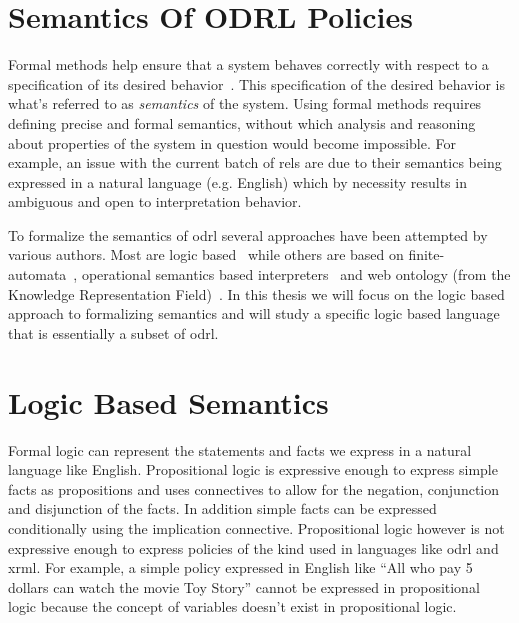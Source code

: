 \section{Semantics Of ODRL Policies}


Formal methods help ensure that a system behaves correctly with respect to a specification of its desired behavior~\cite{TAPL}. This specification of the desired behavior is what's referred to as \emph{semantics} of the system. Using formal methods requires defining precise and formal semantics, without which analysis and reasoning about properties of the system in question would become impossible. For example, an issue with the current batch of \ac{rel}s are due to their semantics being expressed in a natural language (e.g. English) which by necessity results in ambiguous and open to interpretation behavior. 

To formalize the semantics of \ac{odrl} several approaches have been attempted by various authors. Most are logic based~\cite{Halpern2008, pucella2006} while others are based on finite-automata~\cite{Holzer}, operational semantics based interpreters~\cite{Safavi-naini} and web ontology (from the Knowledge Representation Field)~\cite{Kasten2010MTS}. In this thesis we will focus on the logic based approach to formalizing semantics and will study a specific logic based language that is essentially a subset of \ac{odrl}.



\section{Logic Based Semantics}


Formal logic can represent the statements and facts we express in a natural language like English. Propositional logic is expressive enough to express simple facts as propositions and uses connectives to allow for the negation, conjunction and disjunction of the facts. In addition simple facts can be expressed conditionally using the implication connective. Propositional logic however is not expressive enough to express policies of the kind used in languages like \ac{odrl} and \ac{xrml}. For example, a simple policy expressed in English like ``All who pay 5 dollars can watch the movie Toy Story'' cannot be expressed in propositional logic because the concept of  variables doesn't exist in propositional logic. 

